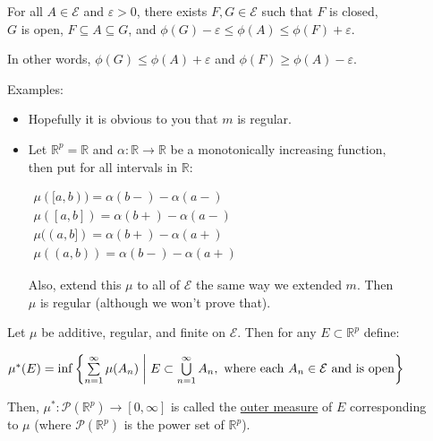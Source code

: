 \documentclass{book}
\newcommand{\hTwo}{%
   \color{MidnightBlue}%
   \fontsize{13}{15}\selectfont%
}
\newenvironment{myIndent}{%
   \begin{adjustwidth}{2.5em}{0em}%
}{%
   \end{adjustwidth}%
}
\newcommand{\udefine}[1]{{%
   \setulcolor{Red}%
   \setul{0.14em}{0.07em}%
   \ul{#1}%
}}
\newcommand{\retTwo}{\hfill\bigbreak}
\begin{document}
{\begin{myIndent}
   For all $A \in \mathcal{E}$ and $\varepsilon > 0$, there exists $F, G \in \mathcal{E}$ such that $F$ is closed,\\ $G$ is open, $F \subseteq A \subseteq G$, and $\phi(G) - \varepsilon \leq \phi(A) \leq \phi(F) + \varepsilon$.\retTwo

   In other words, $\phi(G) \leq \phi(A) + \varepsilon$ and $\phi(F) \geq \phi(A) - \varepsilon$.

   \newpage

   \hTwo
   Examples:
   \begin{itemize}
      \item Hopefully it is obvious to you that $m$ is regular.
      \item Let $\mathbb{R}^p = \mathbb{R}$ and $\alpha: \mathbb{R} \longrightarrow \mathbb{R}$ be a monotonically increasing function,\\ then put for all intervals in $\mathbb{R}$:
      
      {\centering $
      \begin{matrix}
         \mu([a, b)) = \alpha(b-) - \alpha(a-) \\
         \mu([a, b]) = \alpha(b+) - \alpha(a-) \\
         \mu((a, b]) = \alpha(b+) - \alpha(a+) \\
         \mu((a, b)) = \alpha(b-) - \alpha(a+)
      \end{matrix}$ \retTwo\par}

      Also, extend this $\mu$ to all of $\mathcal{E}$ the same way we extended $m$. Then\\ $\mu$ is regular (although we won't prove that).\retTwo
   \end{itemize}
\end{myIndent}}

Let $\mu$ be additive, regular, and finite on $\mathcal{E}$. Then for any $E \subset \mathbb{R}^p$ define:

{\centering $\mu^*(E) = \inf\left\{\sum\limits_{n=1}^\infty \mu(A_n) \hspace{0.3em}\middle|\hspace{0.3em} E \subset \bigcup\limits_{n=1}^\infty A_n, \text{ where each } A_n \in \mathcal{E} \text{ and is open}\right\}$ \retTwo\par}

Then, $\mu^*: \mathcal{P}(\mathbb{R}^p)\longrightarrow [0, \infty]$ is called the \udefine{outer measure} of $E$ corresponding\\ to $\mu$ (where $\mathcal{P}(\mathbb{R}^p)$ is the power set of $\mathbb{R}^p$).
\end{document}
